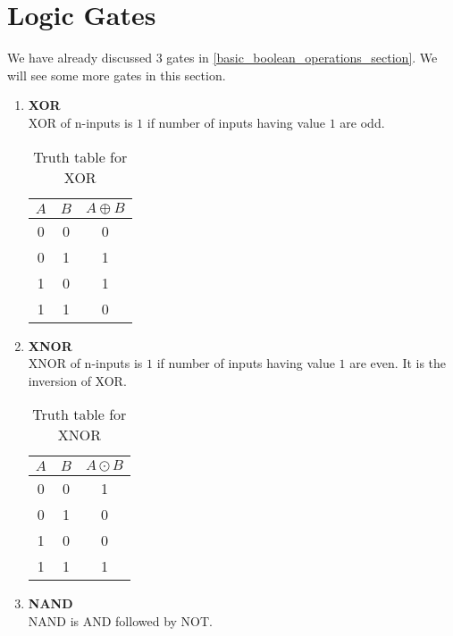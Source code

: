 \documentclass[oneside]{book}
\begin{document}
\section{Logic Gates}
We have already discussed 3 gates in \cref{basic_boolean_operations_section}. We will see some more gates in this section.
\begin{enumerate}
	\item \textbf{XOR}\\
	      XOR of n-inputs is $1$ if number of inputs having value $1$ are odd.
	      \begin{table}[ht]
		      \centering
		      \begin{tabular}{|cc|c|}
			      \hline
			      $A$ & $B$ & $A\oplus B$ \\
			      \hline
			      0   & 0   & 0           \\
			      0   & 1   & 1           \\
			      1   & 0   & 1           \\
			      1   & 1   & 0           \\
			      \hline
		      \end{tabular}
		      \caption{Truth table for XOR}
		      \label{truth_table_for_xor}
	      \end{table}
	\item \textbf{XNOR}\\
	      XNOR of n-inputs is $1$ if number of inputs having value $1$ are even. It is the inversion of XOR.
	      \begin{table}[ht]
		      \centering
		      \begin{tabular}{|cc|c|}
			      \hline
			      $A$ & $B$ & $A\odot B$ \\
			      \hline
			      0   & 0   & 1          \\
			      0   & 1   & 0          \\
			      1   & 0   & 0          \\
			      1   & 1   & 1          \\
			      \hline
		      \end{tabular}
		      \caption{Truth table for XNOR}
		      \label{truth_table_for_xnor}
	      \end{table}
	\item \textbf{NAND}\\
	      NAND is AND followed by NOT.
	      \begin{table}[ht]
		      \centering
		      \begin{tabular}{|cc|c|}

\end{tabular}
\end{table}
\end{enumerate}
\end{document}
